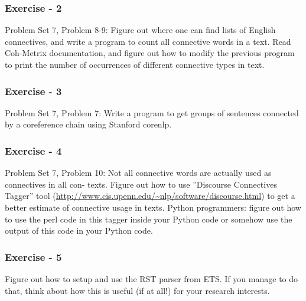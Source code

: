 \documentclass{beamer}
\begin{document}
\begin{frame}
\frametitle{Exercise - 2}
Problem Set 7, Problem 8-9: Figure out where one can find lists of English connectives, and write
a program to count all connective words in a text. Read Coh-Metrix documentation, and figure out how to modify the
previous program to print the number of occurrences of different connective types in text.
\end{frame}

\begin{frame}
\frametitle{Exercise - 3}
Problem Set 7, Problem 7: Write a program to get groups of sentences connected by a coreference
chain using Stanford corenlp.
\end{frame}

\begin{frame}
\frametitle{Exercise - 4}
Problem Set 7, Problem 10: Not all connective words are actually used as connectives in all con-
texts. Figure out how to use ”Discourse Connectives Tagger” tool
(\url{http://www.cis.upenn.edu/~nlp/software/discourse.html}) to get
a better estimate of connective usage in texts. Python programmers:
figure out how to use the perl code in this tagger inside your Python
code or somehow use the output of this code in your Python code.
\end{frame}

\begin{frame}
\frametitle{Exercise - 5}
Figure out how to setup and use the RST parser from ETS. If you manage to do that, think about how this is useful (if at all!) for your research interests.
\end{frame}
\end{document}
